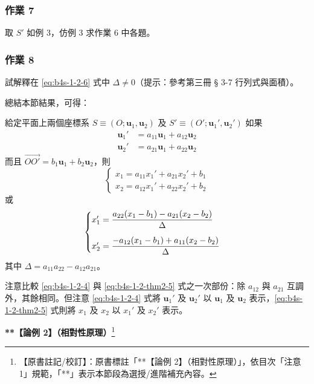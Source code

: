 \subsubsection*{作業 7}
取 $S'$ 如例 3，仿例 3 求作業 6 中各題。

\subsubsection*{作業 8}
試解釋在 \eqref{eq:b4s-1-2-6} 式中 $\Delta \neq 0$（提示：參考第三冊 § 3-7 行列式與面積）。

總結本節結果，可得：

\begin{theorem}[定理 2]
給定平面上兩個座標系 $S \equiv (O; \mathbf{u}_1, \mathbf{u}_2)$ 及 $S' \equiv (O'; \mathbf{u}_1', \mathbf{u}_2')$ 如果
\begin{align*}
\mathbf{u}_1' &= a_{11}\mathbf{u}_1 + a_{12}\mathbf{u}_2 \\
\mathbf{u}_2' &= a_{21}\mathbf{u}_1 + a_{22}\mathbf{u}_2
\end{align*}
而且 $\vec{OO'} = b_1\mathbf{u}_1 + b_2\mathbf{u}_2$，則
\begin{equation}
\begin{cases}
x_1 = a_{11}x_1' + a_{21}x_2' + b_1 \\
x_2 = a_{12}x_1' + a_{22}x_2' + b_2
\end{cases} \label{eq:b4s-1-2-thm2-5}
\end{equation}
或
\begin{equation}
\begin{cases}
x_1' = \dfrac{a_{22}(x_1 - b_1) - a_{21}(x_2 - b_2)}{\Delta} \\ \noalign{\vskip 1em}
x_2' = \dfrac{-a_{12}(x_1 - b_1) + a_{11}(x_2 - b_2)}{\Delta}
\end{cases} \label{eq:b4s-1-2-thm2-6}
\end{equation}
其中 $\Delta = a_{11}a_{22} - a_{12}a_{21}$。
\end{theorem}

注意比較 \eqref{eq:b4s-1-2-4} 與 \eqref{eq:b4s-1-2-thm2-5} 式之一次部份：除 $a_{12}$ 與 $a_{21}$ 互調外，其餘相同。但注意 \eqref{eq:b4s-1-2-4} 式將 $\mathbf{u}_1'$ 及 $\mathbf{u}_2'$ 以 $\mathbf{u}_1$ 及 $\mathbf{u}_2$ 表示，\eqref{eq:b4s-1-2-thm2-5} 式則將 $x_1$ 及 $x_2$ 以 $x_1'$ 及 $x_2'$ 表示。

\vspace{1em}
\noindent\textbf{**【論例 2】（相對性原理）}\label{note:b4s-ch1-p16-lorentz}\footnote{【原書註記/校訂】：原書標註「**【論例 2】（相對性原理）」，依目次「注意 1」規範，「**」表示本節段為選授/進階補充內容。}

